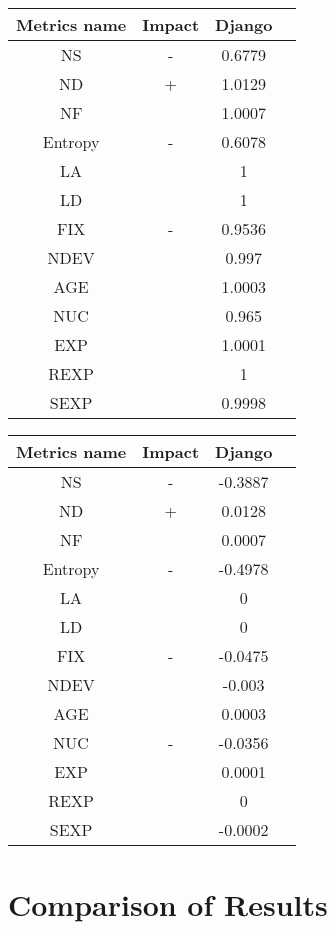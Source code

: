 \documentclass[10pt, conference]{IEEEtran}
\begin{document}
\begin{table}
	\begin{tabular}{|c|c|c|c|}
		\hline Metrics name & Impact & Django \\ 
		\hline NS & - & 0.6779 \\ 
		\hline ND & + & 1.0129 \\ 
		\hline NF &  & 1.0007 \\ 
		\hline Entropy & - & 0.6078 \\ 
		\hline LA &  & 1 \\ 
		\hline LD &  & 1 \\ 
		\hline FIX & - & 0.9536 \\ 
		\hline NDEV &  & 0.997 \\ 
		\hline AGE &  & 1.0003 \\ 
		\hline NUC &  & 0.965 \\ 
		\hline EXP &  & 1.0001 \\ 
		\hline REXP &  & 1 \\ 
		\hline SEXP &  & 0.9998 \\ 
		\hline 
	\end{tabular}
	\label{table:odds_ratio}  
\end{table}


\begin{table}
	\begin{tabular}{|c|c|c|c|}
		\hline Metrics name & Impact & Django \\ 
		\hline NS & - & -0.3887 \\ 
		\hline ND & + & 0.0128 \\ 
		\hline NF &  & 0.0007 \\ 
		\hline Entropy & - & -0.4978 \\ 
		\hline LA &  & 0 \\ 
		\hline LD &  & 0 \\ 
		\hline FIX & - & -0.0475 \\ 
		\hline NDEV &  & -0.003 \\ 
		\hline AGE &  & 0.0003 \\ 
		\hline NUC & - & -0.0356 \\ 
		\hline EXP &  & 0.0001 \\ 
		\hline REXP &  & 0 \\ 
		\hline SEXP &  & -0.0002 \\ 
		\hline 
	\end{tabular}
	\label{table:regression_coefficients} 
\end{table}


\section{Comparison of Results}
\label{sec:comparison-results}
\end{document}
